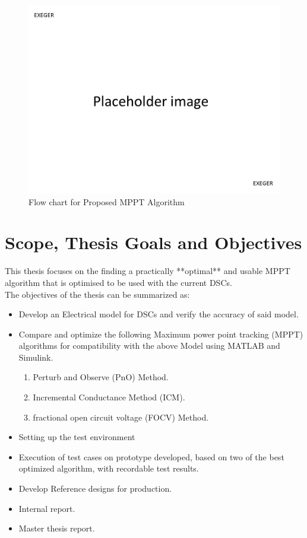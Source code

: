  \begin{figure}[H]
   \begin{center}
   \includegraphics[width=\textwidth]{images/pacehold}
   \caption{ Flow chart for Proposed MPPT Algorithm }
   \label{fig:cyflow}
   \end{center}
  \end{figure}


\section{Scope, Thesis Goals and Objectives}

This thesis focuses on the finding a practically **optimal** and usable \ac{MPPT} algorithm that is optimised to be used with the current \ac{DSCs}.\\


The objectives of the thesis can be summarized as:
\begin{itemize}

\item Develop an Electrical model for DSCs and verify the accuracy of said model.
 
\item Compare and optimize the following Maximum power point tracking (MPPT) algorithms for compatibility with the above Model using MATLAB{\textregistered} and Simulink{\textregistered}.
	\begin{enumerate}
		\item Perturb and Observe (\ac{PnO}) Method.
		\item Incremental Conductance Method (\ac{ICM}).
		\item fractional open circuit voltage (\ac{FOCV}) Method.
		
	\end{enumerate}
\item Setting up the test environment   
\item Execution of test cases on prototype developed, based on two of the best optimized algorithm, with recordable test results.
\item Develop Reference designs for production.
\item Internal report.
\item  Master thesis report. 
\end {itemize}

